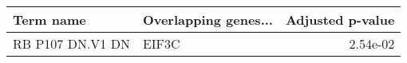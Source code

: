 \begin{tabular}{llr}
\toprule
       Term name & Overlapping genes... &  Adjusted p-value \\
\midrule
RB P107 DN.V1 DN &                EIF3C &          2.54e-02 \\
\bottomrule
\end{tabular}

